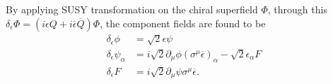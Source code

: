 \documentclass[12pt]{report}
\begin{document}
By applying SUSY transformation on the chiral superfield $\Phi$, through this $\delta_{\epsilon} \Phi = (i \epsilon Q + i \overline{\epsilon} \overline{Q}) \Phi$, the component fields are found to be
\begin{align} 
\delta_{\epsilon} \phi &= \sqrt{2} \epsilon \psi \label{eq: SUSY transformation 4}\\
\delta_{\epsilon} \psi_{\alpha} &= i \sqrt{2}  \partial_{\mu} \phi (\sigma^{\mu} \overline{\epsilon})_{\alpha} - \sqrt{2} \epsilon_{\alpha} F \label{eq: SUSY transformation 5}\\
\delta_{\epsilon} F &= i \sqrt{2}  \partial_{\mu} \psi \sigma^{\mu} \overline{\epsilon} \label{eq: SUSY transformation 6}.
\end{align}
\end{document}
